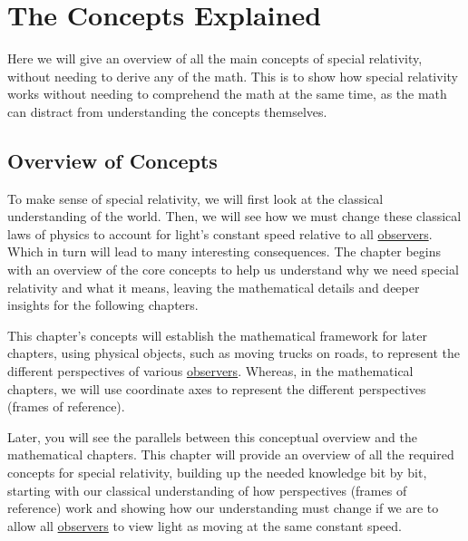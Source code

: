 \mainmatter

\part{The Concepts Explained} %

Here we will give an overview of all the main concepts of special relativity, without needing to derive any of the math.
This is to show how special relativity works without needing to comprehend the math at the same time, as the math can distract from understanding the concepts themselves.


\chapter{Overview of Concepts} \label{ch: Conceptual Overview}

To make sense of special relativity, we will first look at the classical understanding of the world.
Then, we will see how we must change these classical laws of physics to account for light's constant speed relative to all \hyperlink{def-observer}{observers}.
Which in turn will lead to many interesting consequences.
The chapter begins with an overview of the core concepts to help us understand why we need special relativity and what it means, leaving the mathematical details and deeper insights for the following chapters.

This chapter's concepts will establish the mathematical framework for later chapters, using physical objects, such as moving trucks on roads, to represent the different perspectives of various \hyperlink{def-observer}{observers}.
Whereas, in the mathematical chapters, we will use coordinate axes to represent the different perspectives (frames of reference).

Later, you will see the parallels between this conceptual overview and the mathematical chapters.
This chapter will provide an overview of all the required concepts for special relativity, building up the needed knowledge bit by bit, starting with our classical understanding of how perspectives (frames of reference) work and showing how our understanding must change if we are to allow all \hyperlink{def-observer}{observers} to view light as moving at the same constant speed.

